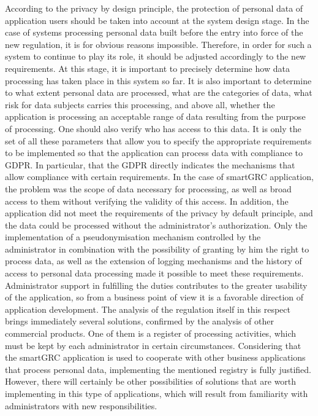 \documentclass[en, noamssymb]{mgr}
\begin{document}
According to the privacy by design principle, the protection of personal data of application users should be taken into account at the system design stage. In the case of systems processing personal data built before the entry into force of the new regulation, it is for obvious reasons impossible. Therefore, in order for such a system to continue to play its role, it should be adjusted accordingly to the new requirements. At this stage, it is important to precisely determine how data processing has taken place in this system so far. It is also important to determine to what extent personal data are processed, what are the categories of data, what risk for data subjects carries this processing, and above all, whether the application is processing an acceptable range of data resulting from the purpose of processing. One should also verify who has access to this data. It is only the set of all these parameters that allow you to specify the appropriate requirements to be implemented so that the application can process data with compliance to GDPR. In particular, that the GDPR directly indicates the mechanisms that allow compliance with certain requirements. In the case of smartGRC application, the problem was the scope of data necessary for processing, as well as broad access to them without verifying the validity of this access. In addition, the application did not meet the requirements of the privacy by default principle, and the data could be processed without the administrator's authorization. Only the implementation of a pseudonymisation mechanism controlled by the administrator in combination with the possibility of granting by him the right to process data, as well as the extension of logging mechanisms and the history of access to personal data processing made it possible to meet these requirements.\\
\indent Administrator support in fulfilling the duties contributes to the greater usability of the application, so from a business point of view it is a favorable direction of application development. The analysis of the regulation itself in this respect brings immediately several solutions, confirmed by the analysis of other commercial products. One of them is a register of processing activities, which must be kept by each administrator in certain circumstances. Considering that the smartGRC application is used to cooperate with other business applications that process personal data, implementing the mentioned registry is fully justified. However, there will certainly be other possibilities of solutions that are worth implementing in this type of applications, which will result from familiarity with administrators with new responsibilities.
\end{document}
